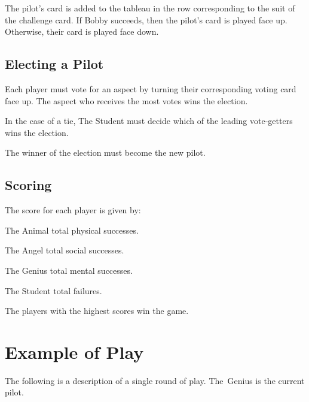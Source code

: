 \documentclass[a4paper, 10pt,notumble]{leaflet}
\begin{document}
The pilot's card is added to the tableau in the row corresponding to the suit of the challenge card. If Bobby succeeds, then the pilot's card is played face up.  Otherwise, their card is played face down. 

\subsection{Electing a Pilot}
Each player must vote for an aspect by turning their corresponding voting card face up.
The aspect who receives the most votes wins the election. 

In the case of a tie, The Student must decide which of the leading vote-getters wins the election. 

The winner of the election must become the new pilot.

\subsection{Scoring}
The score for each player is given by:
\begin{playerlistnarrow}
	\item[The Animal\normalfont{:}] total physical successes.
	\item[The Angel\normalfont{:}] total social successes.
	\item[The Genius\normalfont{:}] total mental successes.
	\item[The Student\normalfont{:}] total failures.
\end{playerlistnarrow}
The players with the highest scores win the game.
\newpage



\section{Example of Play}
The following is a description of a single round of play. The~Genius is the current pilot.
\end{document}

